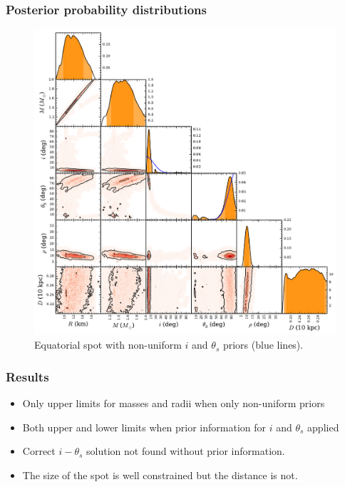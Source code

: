 \documentclass{beamer}
\def\thetas{\theta_{s}}
\begin{document}



\begin{frame}
\frametitle{Posterior probability distributions}

\begin{figure}
\includegraphics[width=0.55\linewidth]{feqprf.pdf}
\caption{Equatorial spot with non-uniform $i$ and $\thetas$ priors (blue lines).}
\end{figure}

\end{frame}


\begin{frame}
\frametitle{Results}
\begin{itemize}
\item Only upper limits for masses and radii when only non-uniform priors
\item Both upper and lower limits when prior information for $i$ and $\thetas$ applied
\item Correct $i-\thetas$ solution not found without prior information.
\item The size of the spot is well constrained but the distance is not.
\end{itemize}

\end{frame}
\end{document}
